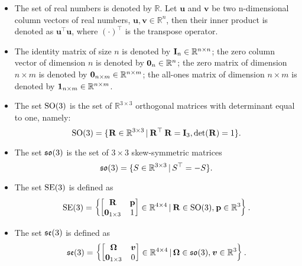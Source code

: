 \begin{itemize}

\item
The set of real numbers is denoted by $\mathbb{R}$.
Let $\mathbf{u}$ and $\mathbf{v}$ be two n-dimensional column vectors of real numbers, \ie $\mathbf{u}, \mathbf{v} \in \mathbb{R}^n$, then their inner product is denoted as $\mathbf{u}^\top \mathbf{u}$, where ${(\cdot)}^\top$ is the transpose operator.

\item
The identity matrix of size $n$ is denoted by $\mathbf{I}_n \in \mathbb{R}^{n \times n}$; the zero column vector of dimension $n$ is denoted by $\boldsymbol{0}_n \in \mathbb{R}^n$; the zero matrix of dimension $n \times m$ is denoted by $\boldsymbol{0}_{n \times m} \in \mathbb{R}^{n \times m}$; the all-ones matrix of dimension $n \times m$ is denoted by $\boldsymbol{1}_{n \times m} \in \mathbb{R}^{n \times m}$.

\item
The set $\text{SO}(3)$ is the set of $\mathbb{R}^{3\times3}$ orthogonal matrices with determinant equal to one, namely:
%
\begin{equation*}
    \text{SO}(3) = \{ \prescript{}{}{\mathbf{R}} \in \mathbb{R}^{3 \times 3} \operatorname{\mid} \prescript{}{}{\mathbf{R}}^\top \prescript{}{}{\mathbf{R}} = \mathbf{I}_3, \operatorname{det}(\prescript{}{}{\mathbf{R}}) = 1 \}
    .
\end{equation*}

\item
The set $\mathfrak{so}(3)$ is the set of $3\times3$ skew-symmetric matrices
%
\begin{equation*}
    \mathfrak{so}(3) = \{ S \in \mathbb{R}^{3\times3} \operatorname{\mid} S^\top = -S \}
    .
\end{equation*}

\item
The set $\text{SE}(3)$ is defined as
%
\begin{equation*}
    \text{SE}(3) = \left\{ \begin{bmatrix} \prescript{}{}{\mathbf{R}} & \prescript{}{}{\mathbf{p}} \\ \boldsymbol{0}_{1 \times 3} & 1 \end{bmatrix}  \in \mathbb{R}^{4 \times 4} \operatorname{\mid} \prescript{}{}{\mathbf{R}} \in \text{SO}(3), \prescript{}{}{\mathbf{p}} \in \mathbb{R}^3 \right\}
    .
\end{equation*}

\item
The set $\mathfrak{se}(3)$ is defined as
\begin{equation*}
    \mathfrak{se}(3) = \left\{ \begin{bmatrix} \boldsymbol{\Omega} & \prescript{}{}{\boldsymbol{v}} \\ \boldsymbol{0}_{1\times3} & 0 \end{bmatrix} \in \mathbb{R}^{4\times4} \operatorname{\mid} \boldsymbol{\Omega} \in \mathfrak{so}(3), \prescript{}{}{\boldsymbol{v}} \in \mathbb{R}^3 \right\}
    .
\end{equation*}


\end{itemize}
